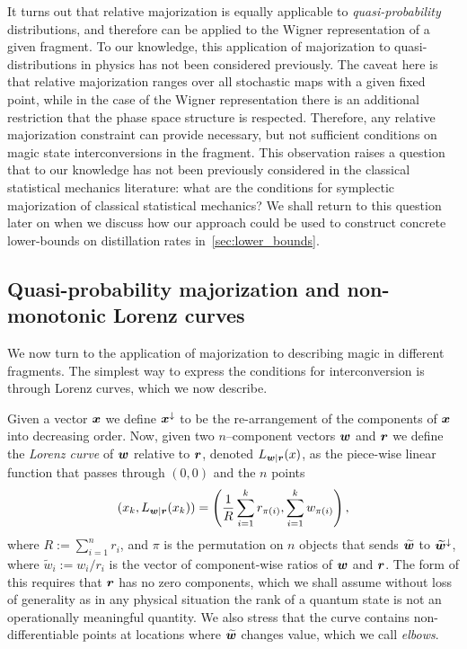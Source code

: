 \documentclass[pra,
aps,
twocolumn,
superscriptaddress,
groupedaddress,
nofootinbib,
reprint
]{revtex4-1}
\begin{document}
It turns out that relative majorization is equally applicable to \emph{quasi-probability} distributions, and therefore can be applied to the Wigner representation of a given fragment. To our knowledge, this application of majorization to quasi-distributions in  physics has not been considered previously. The caveat here is that relative majorization ranges over all stochastic maps with a given fixed point, while in the case of the Wigner representation there is an additional restriction that the phase space structure is respected. Therefore, any relative majorization constraint can provide necessary, but not sufficient conditions on magic state interconversions in the fragment. This observation raises a question that to our knowledge has not been previously considered in the classical statistical mechanics literature: what are the conditions for symplectic majorization of classical statistical mechanics? We shall return to this question later on when we discuss how our approach could be used to construct concrete lower-bounds on distillation rates in~\cref{sec:lower_bounds}.

\subsection{Quasi-probability majorization and non-monotonic Lorenz curves}
\label{sec:lc}

We now turn to the application of majorization to describing magic in different fragments. The simplest way to express the conditions for interconversion is through Lorenz curves, which we now describe.

Given a vector $\boldsymbol{x}$ we define $\boldsymbol{x}^\downarrow$ to be the re-arrangement of the components of $\boldsymbol{x}$ into decreasing order. Now, given two $n$--component vectors $\boldsymbol{w}$ and $\boldsymbol{r}$ we define the \emph{Lorenz curve} of $\boldsymbol{w}$ relative to $\boldsymbol{r}$, denoted $L_{\boldsymbol{w}|\boldsymbol{r}}(x)$, as the piece-wise linear function that passes through $(0,0)$ and the $n$ points
\begin{equation}
\label{eq:lc}
        (x_k,L_{\boldsymbol{w}|\boldsymbol{r}}(x_k)) =\left( \frac{1}{R}\sum_{i=1}^k r_{\pi(i)}, \sum_{i=1}^k w_{\pi(i)} \right),
\end{equation}
where $R:= \sum_{i=1}^n r_i$, and $\pi$ is the permutation on $n$ objects that sends $\widetilde{\boldsymbol{w}}$ to $\widetilde{\boldsymbol{w}}^{\downarrow}$, where $\widetilde{w}_i := w_i/r_i$ is the vector of component-wise ratios of $\boldsymbol{w}$ and $\boldsymbol{r}$. The form of this requires that $\boldsymbol{r}$ has no zero components, which we shall assume without loss of generality as in any physical situation the rank of a quantum state is not an operationally meaningful quantity.
We also stress that the curve contains non-differentiable points at locations where $\widetilde{\bm{w}}$ changes value, which we call \emph{elbows}.
\end{document}
